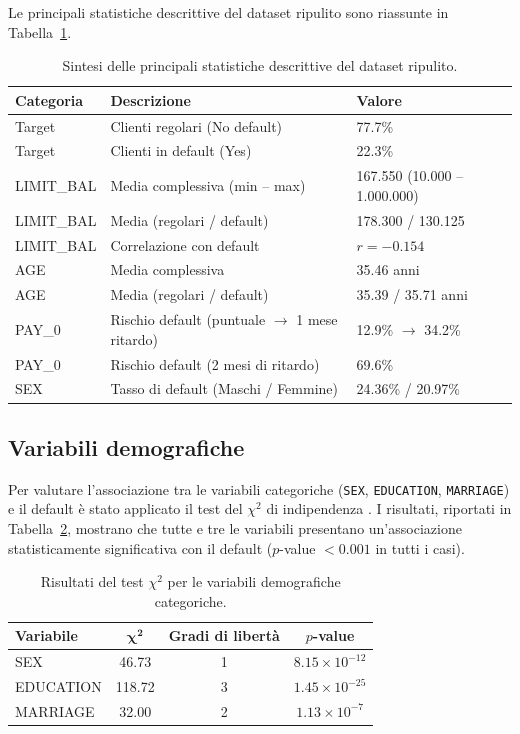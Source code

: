 \documentclass[11pt,a4paper]{article}
\begin{document}
Le principali statistiche descrittive del dataset ripulito sono riassunte in Tabella~\ref{tab:statistiche}.

\begin{table}[H]
\centering
\caption{Sintesi delle principali statistiche descrittive del dataset ripulito.}
\label{tab:statistiche}
\begin{tabular}{lll}
\toprule
\textbf{Categoria} & \textbf{Descrizione} & \textbf{Valore} \\
\midrule
Target & Clienti regolari (No default) & 77.7\% \\
Target & Clienti in default (Yes) & 22.3\% \\
LIMIT\_BAL & Media complessiva (min -- max) & 167.550 (10.000 -- 1.000.000) \\
LIMIT\_BAL & Media (regolari / default) & 178.300 / 130.125 \\
LIMIT\_BAL & Correlazione con default & $r = -0.154$ \\
AGE & Media complessiva & 35.46 anni \\
AGE & Media (regolari / default) & 35.39 / 35.71 anni \\
PAY\_0 & Rischio default (puntuale $\rightarrow$ 1 mese ritardo) & 12.9\% $\rightarrow$ 34.2\% \\
PAY\_0 & Rischio default (2 mesi di ritardo) & 69.6\% \\
SEX & Tasso di default (Maschi / Femmine) & 24.36\% / 20.97\% \\
\bottomrule
\end{tabular}
\end{table}

\subsection{Variabili demografiche}

Per valutare l'associazione tra le variabili categoriche (\texttt{SEX}, \texttt{EDUCATION}, \texttt{MARRIAGE}) e il default è stato applicato il test del $\chi^2$ di indipendenza \cite{poggi2025}. I risultati, riportati in Tabella~\ref{tab:chi2}, mostrano che tutte e tre le variabili presentano un'associazione statisticamente significativa con il default ($p$-value $< 0.001$ in tutti i casi).

\begin{table}[H]
\centering
\caption{Risultati del test $\chi^2$ per le variabili demografiche categoriche.}
\label{tab:chi2}
\begin{tabular}{lccc}
\toprule
\textbf{Variabile} & $\boldsymbol{\chi^2}$ & \textbf{Gradi di libertà} & \textbf{$p$-value} \\
\midrule
SEX       & 46.73  & 1 & $8.15 \times 10^{-12}$ \\
EDUCATION & 118.72 & 3 & $1.45 \times 10^{-25}$ \\
MARRIAGE  & 32.00  & 2 & $1.13 \times 10^{-7}$ \\
\bottomrule
\end{tabular}
\end{table}
\end{document}
